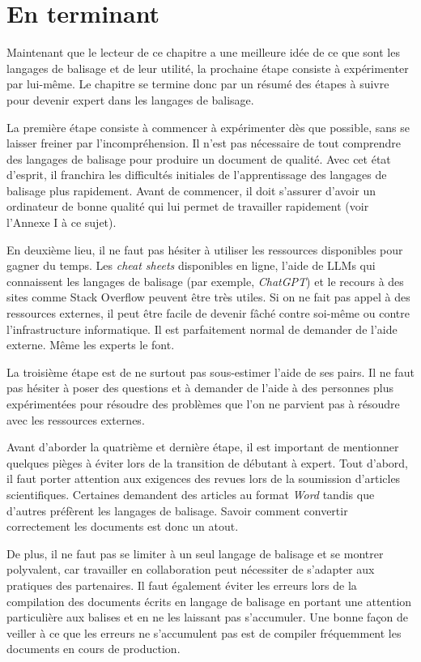 \documentclass[
  letterpaper,
  DIV=11,
  numbers=noendperiod,
  oneside]{scrreprt}
\begin{document}
\hypertarget{en-terminant-7}{%
\section{En terminant}\label{en-terminant-7}}

Maintenant que le lecteur de ce chapitre a une meilleure idée de ce que
sont les langages de balisage et de leur utilité, la prochaine étape
consiste à expérimenter par lui-même. Le chapitre se termine donc par un
résumé des étapes à suivre pour devenir expert dans les langages de
balisage.

La première étape consiste à commencer à expérimenter dès que possible,
sans se laisser freiner par l'incompréhension. Il n'est pas nécessaire
de tout comprendre des langages de balisage pour produire un document de
qualité. Avec cet état d'esprit, il franchira les difficultés initiales
de l'apprentissage des langages de balisage plus rapidement. Avant de
commencer, il doit s'assurer d'avoir un ordinateur de bonne qualité qui
lui permet de travailler rapidement (voir l'Annexe I à ce sujet).

En deuxième lieu, il ne faut pas hésiter à utiliser les ressources
disponibles pour gagner du temps. Les \emph{cheat sheets} disponibles en
ligne, l'aide de LLMs qui connaissent les langages de balisage (par
exemple, \emph{ChatGPT}) et le recours à des sites comme Stack Overflow
peuvent être très utiles. Si on ne fait pas appel à des ressources
externes, il peut être facile de devenir fâché contre soi-même ou contre
l'infrastructure informatique. Il est parfaitement normal de demander de
l'aide externe. Même les experts le font.

La troisième étape est de ne surtout pas sous-estimer l'aide de ses
pairs. Il ne faut pas hésiter à poser des questions et à demander de
l'aide à des personnes plus expérimentées pour résoudre des problèmes
que l'on ne parvient pas à résoudre avec les ressources externes.

Avant d'aborder la quatrième et dernière étape, il est important de
mentionner quelques pièges à éviter lors de la transition de débutant à
expert. Tout d'abord, il faut porter attention aux exigences des revues
lors de la soumission d'articles scientifiques. Certaines demandent des
articles au format \emph{Word} tandis que d'autres préfèrent les
langages de balisage. Savoir comment convertir correctement les
documents est donc un atout.

De plus, il ne faut pas se limiter à un seul langage de balisage et se
montrer polyvalent, car travailler en collaboration peut nécessiter de
s'adapter aux pratiques des partenaires. Il faut également éviter les
erreurs lors de la compilation des documents écrits en langage de
balisage en portant une attention particulière aux balises et en ne les
laissant pas s'accumuler. Une bonne façon de veiller à ce que les
erreurs ne s'accumulent pas est de compiler fréquemment les documents en
cours de production.
\end{document}
